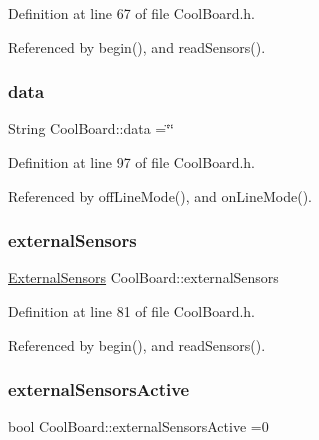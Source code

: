 Definition at line 67 of file Cool\+Board.\+h.



Referenced by begin(), and read\+Sensors().

\mbox{\label{classCoolBoard_a427fb753dd8575bdf821c70a5c63d695}} 
\subsubsection{\texorpdfstring{data}{data}}
{\footnotesize\ttfamily String Cool\+Board\+::data =\char`\"{}\char`\"{}\hspace{0.3cm}{\ttfamily [private]}}



Definition at line 97 of file Cool\+Board.\+h.



Referenced by off\+Line\+Mode(), and on\+Line\+Mode().

\mbox{\label{classCoolBoard_a09e26264839c65873eb56af476eff6b2}} 
\subsubsection{\texorpdfstring{external\+Sensors}{externalSensors}}
{\footnotesize\ttfamily \hyperlink{classExternalSensors}{External\+Sensors} Cool\+Board\+::external\+Sensors\hspace{0.3cm}{\ttfamily [private]}}



Definition at line 81 of file Cool\+Board.\+h.



Referenced by begin(), and read\+Sensors().

\mbox{\label{classCoolBoard_a638b00b76aeb819ecfd4c10b8cdd7bb7}} 
\subsubsection{\texorpdfstring{external\+Sensors\+Active}{externalSensorsActive}}
{\footnotesize\ttfamily bool Cool\+Board\+::external\+Sensors\+Active =0\hspace{0.3cm}{\ttfamily [private]}}



